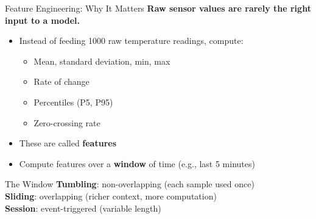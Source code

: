 \documentclass[aspectratio=169,11pt]{beamer}
\begin{document}
\begin{frame}{Feature Engineering: Why It Matters}
    \textbf{Raw sensor values are rarely the right input to a model.}

    \vspace{0.3cm}
    \begin{itemize}
        \item Instead of feeding 1000 raw temperature readings, compute:
        \begin{itemize}
            \item Mean, standard deviation, min, max
            \item Rate of change
            \item Percentiles (P5, P95)
            \item Zero-crossing rate
        \end{itemize}
        \item These are called \textbf{features}
        \item Compute features over a \textbf{window} of time (e.g., last 5 minutes)
    \end{itemize}

    \vspace{0.3cm}
    \begin{block}{The Window}
        \textbf{Tumbling}: non-overlapping (each sample used once)\\
        \textbf{Sliding}: overlapping (richer context, more computation)\\
        \textbf{Session}: event-triggered (variable length)
    \end{block}
\end{frame}

\end{document}
